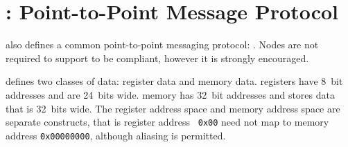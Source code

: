 \newcommand{\mpqrecord}{{\bf \color{blue} Record}\xspace}

\section{\proto: Point-to-Point Message Protocol}
\bus also defines a common point-to-point messaging protocol: \proto.
Nodes are not required to support \proto to be \bus compliant, however it is
strongly encouraged.

\proto defines two classes of data: register data and memory data. \proto
registers have 8~bit addresses and are 24~bits wide. \proto memory has 32~bit
addresses and stores data that is 32~bits wide. The register address space and
memory address space are separate constructs, that is register address {\tt
0x00} need not map to memory address {\tt 0x00000000}, although aliasing is
permitted.

